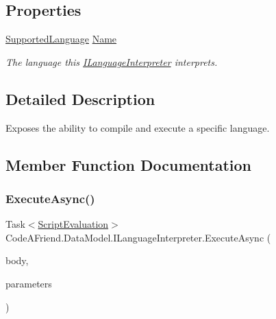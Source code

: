 \subsection*{Properties}
\begin{DoxyCompactItemize}
\item 
\mbox{\hyperlink{namespace_code_a_friend_1_1_data_model_a13e088c525db1b03a4de75420ced79b2}{Supported\+Language}} \mbox{\hyperlink{interface_code_a_friend_1_1_data_model_1_1_i_language_interpreter_ab8d4ee55278929fb59f3f015789aaa36}{Name}}
\begin{DoxyCompactList}\small\item\em The language this \mbox{\hyperlink{interface_code_a_friend_1_1_data_model_1_1_i_language_interpreter}{I\+Language\+Interpreter}} interprets. \end{DoxyCompactList}\end{DoxyCompactItemize}


\subsection{Detailed Description}
Exposes the ability to compile and execute a specific language. 



\subsection{Member Function Documentation}
\mbox{\label{interface_code_a_friend_1_1_data_model_1_1_i_language_interpreter_a3003897aaa13ee672b6157c584e46898}} 
\subsubsection{\texorpdfstring{Execute\+Async()}{ExecuteAsync()}}
{\footnotesize\ttfamily Task$<$\mbox{\hyperlink{class_code_a_friend_1_1_data_model_1_1_script_evaluation}{Script\+Evaluation}}$>$ Code\+A\+Friend.\+Data\+Model.\+I\+Language\+Interpreter.\+Execute\+Async (\begin{DoxyParamCaption}\item[{string}]{body,  }\item[{\mbox{\hyperlink{class_code_a_friend_1_1_data_model_1_1_execution_parameters}{Execution\+Parameters}}}]{parameters }\end{DoxyParamCaption})}



